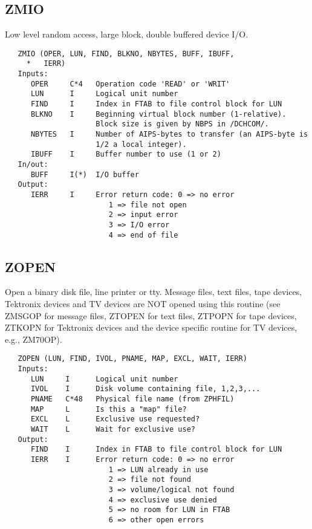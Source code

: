 \subsection{ZMIO}
Low level random access, large block, double buffered device I/O.
\begin{verbatim}
   ZMIO (OPER, LUN, FIND, BLKNO, NBYTES, BUFF, IBUFF,
     *   IERR)
   Inputs:
      OPER     C*4   Operation code 'READ' or 'WRIT'
      LUN      I     Logical unit number
      FIND     I     Index in FTAB to file control block for LUN
      BLKNO    I     Beginning virtual block number (1-relative).
                     Block size is given by NBPS in /DCHCOM/.
      NBYTES   I     Number of AIPS-bytes to transfer (an AIPS-byte is
                     1/2 a local integer).
      IBUFF    I     Buffer number to use (1 or 2)
   In/out:
      BUFF     I(*)  I/O buffer
   Output:
      IERR     I     Error return code: 0 => no error
                        1 => file not open
                        2 => input error
                        3 => I/O error
                        4 => end of file
\end{verbatim}

\subsection{ZOPEN}
Open a binary disk file, line printer or tty.  Message files, text
files, tape devices, Tektronix devices and TV devices are NOT opened
using this routine (see ZMSGOP for message files, ZTOPEN for text
files, ZTPOPN for tape devices, ZTKOPN for Tektronix devices and the
device specific routine for TV devices, e.g., ZM70OP).
\begin{verbatim}
   ZOPEN (LUN, FIND, IVOL, PNAME, MAP, EXCL, WAIT, IERR)
   Inputs:
      LUN     I      Logical unit number
      IVOL    I      Disk volume containing file, 1,2,3,...
      PNAME   C*48   Physical file name (from ZPHFIL)
      MAP     L      Is this a "map" file?
      EXCL    L      Exclusive use requested?
      WAIT    L      Wait for exclusive use?
   Output:
      FIND    I      Index in FTAB to file control block for LUN
      IERR    I      Error return code: 0 => no error
                        1 => LUN already in use
                        2 => file not found
                        3 => volume/logical not found
                        4 => exclusive use denied
                        5 => no room for LUN in FTAB
                        6 => other open errors
\end{verbatim}


